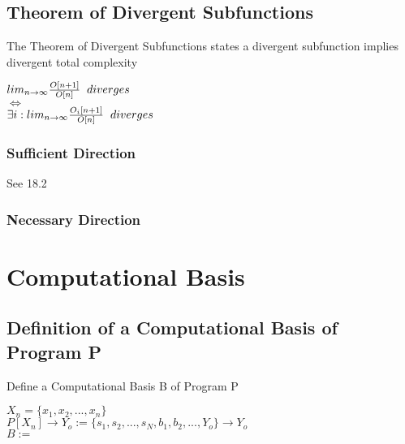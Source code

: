 \documentclass[11pt]{article}
\begin{document}
\subsection{Theorem of Divergent Subfunctions}
The Theorem of Divergent Subfunctions states a divergent subfunction implies divergent total complexity
\begin{center}
\vspace{2mm}
$
lim_{n\rightarrow \infty} \frac{O[n+1]}{O[n]} \hspace{2mm} diverges 
$
\\ \vspace{2mm}
$
\Longleftrightarrow
$
\\ \vspace{2mm}
$
\exists i : lim_{n \rightarrow \infty}\frac{O_i[n+1]}{O[n]} \hspace{2mm} diverges
$
\end{center}



\subsubsection{Sufficient Direction}
See 18.2



\subsubsection{Necessary Direction}







\newpage
\section{Computational Basis}


\subsection{Definition of a Computational Basis of Program P}
Define a Computational Basis B of Program P
\begin{center}
\vspace{1mm}
$
X_n = \{x_1,x_2,...,x_n\}
$
\\ \vspace{2mm}
$
P[X_n] \rightarrow Y_o := \{s_1,s_2,...,s_N,b_1,b_2,...,Y_o\} \rightarrow Y_o
$
\\ \vspace{6mm}
$
B :=
$
\end{center}
\end{document}
